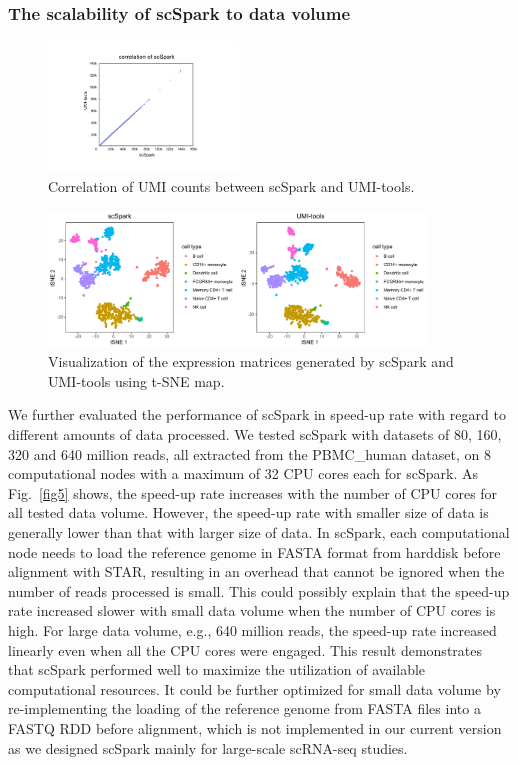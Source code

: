 \documentclass[conference]{IEEEtran}
\begin{document}
\subsubsection{The scalability of scSpark to data volume}
\begin{figure}
	\centering
	\includegraphics[width=0.45\textwidth]{fig6.pdf}
	\caption{Correlation of UMI counts between scSpark and UMI-tools.} \label{fig6}
\end{figure}
\begin{figure}
	\centering
	\includegraphics[width=0.9\textwidth]{fig7.pdf}
	\caption{Visualization of the expression matrices generated by scSpark and UMI-tools using t-SNE map.} \label{fig7}
\end{figure}

We further evaluated the performance of scSpark in speed-up rate with regard to different amounts of data processed.  
We tested scSpark with datasets of 80, 160, 320 and 640 million reads, all extracted from the PBMC\_human dataset, on 8 computational nodes with a maximum of 32 CPU cores each for scSpark. 
As Fig.~\ref{fig5} shows, the speed-up rate increases with the number of CPU cores for all tested data volume. 
However, the speed-up rate with smaller size of data is generally lower than that with larger size of data. 
In scSpark, each computational node needs to load the reference genome in FASTA format from harddisk before alignment with STAR, resulting in an overhead that cannot be ignored when the number of reads processed is small. 
This could possibly explain that the speed-up rate increased slower with small data volume when the number of CPU cores is high.  
For large data volume, e.g., 640 million reads, the speed-up rate increased linearly even when all the CPU cores were engaged.  
This result demonstrates that scSpark performed well to maximize the utilization of available computational resources. It could be further optimized for small data volume by re-implementing the loading of the reference genome from FASTA files into a FASTQ RDD before alignment, which is not implemented in our current version as we designed scSpark mainly for large-scale scRNA-seq studies. 
\end{document}
